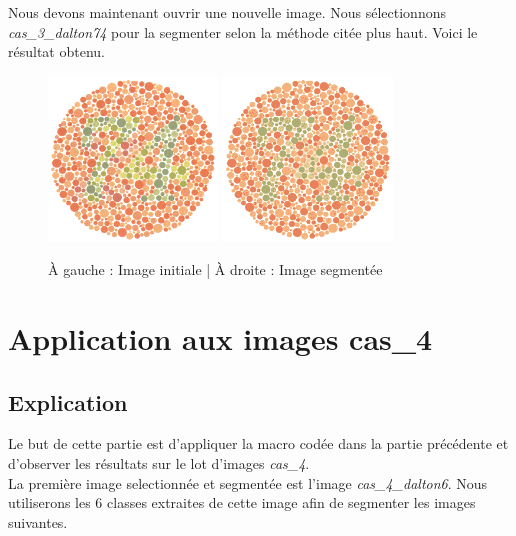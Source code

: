 \documentclass[a4paper]{article}
\begin{document}
Nous devons maintenant ouvrir une nouvelle image. Nous sélectionnons {\em cas\_3\_dalton74} pour la segmenter selon la méthode citée plus haut. Voici le résultat obtenu.

\begin{figure}[H]
\begin{center}
\includegraphics[width=170px]{../base/cas_3_dalton74.png}
\includegraphics[width=170px]{../resultats/cas_3_dalton74.png}
\end{center}
\caption{À gauche : Image initiale | À droite : Image segmentée}
\end{figure}

\clearpage
\section{Application aux images cas\_4}

\subsection{Explication}

Le but de cette partie est d'appliquer la macro codée dans la partie précédente et d'observer les résultats sur le lot d'images {\em cas\_4}.\\

La première image selectionnée et segmentée est l'image {\em cas\_4\_dalton6}. Nous utiliserons les 6 classes extraites de cette image afin de segmenter les images suivantes.
\end{document}
